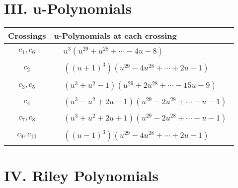 \documentclass[1p]{elsarticle_modified}
\theoremstyle{definition}
\begin{document}
\newpage\renewcommand{\arraystretch}{1}
\centering \section*{ III. u-Polynomials}
\begin{tabular}{m{50pt}|m{274pt}}
Crossings & \hspace{64pt}u-Polynomials at each crossing \\
\hline $$\begin{aligned}c_{1},c_{6}\end{aligned}$$&$\begin{aligned}
&u^3(u^{29}+u^{28}+\cdots-4 u-8)
\end{aligned}$\\
\hline $$\begin{aligned}c_{2}\end{aligned}$$&$\begin{aligned}
&((u+1)^3)(u^{29}-4 u^{28}+\cdots+2 u-1)
\end{aligned}$\\
\hline $$\begin{aligned}c_{3},c_{5}\end{aligned}$$&$\begin{aligned}
&(u^3+u^2-1)(u^{29}+2 u^{28}+\cdots-15 u-9)
\end{aligned}$\\
\hline $$\begin{aligned}c_{4}\end{aligned}$$&$\begin{aligned}
&(u^3- u^2+2 u-1)(u^{29}-2 u^{28}+\cdots+u-1)
\end{aligned}$\\
\hline $$\begin{aligned}c_{7},c_{8}\end{aligned}$$&$\begin{aligned}
&(u^3+u^2+2 u+1)(u^{29}-2 u^{28}+\cdots+u-1)
\end{aligned}$\\
\hline $$\begin{aligned}c_{9},c_{10}\end{aligned}$$&$\begin{aligned}
&((u-1)^3)(u^{29}-4 u^{28}+\cdots+2 u-1)
\end{aligned}$\\
\hline
\end{tabular}\newpage\renewcommand{\arraystretch}{1}
\centering \section*{ IV. Riley Polynomials}
\end{document}
